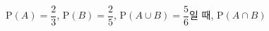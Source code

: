 $\mathrm{P}(A)=\dfrac{2}{3}$, $\mathrm{P}(B)=\dfrac{2}{5}$, $\mathrm{P}(A\cup B)=\dfrac{5}{6}$일 때, $\mathrm{P}(A\cap B)$

